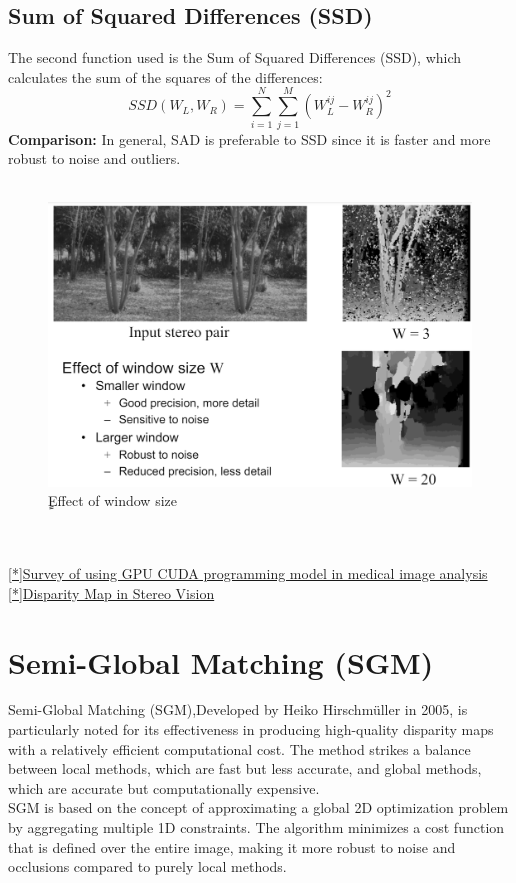 \documentclass[22pt]{report}
\begin{document}
        \subsection{Sum of Squared Differences (SSD)}
        The second function used is the Sum of Squared Differences (SSD), which calculates the sum of the squares of the differences:
        \[
        SSD(W_L, W_R) = \sum_{i=1}^N \sum_{j=1}^M (W_L^{ij} - W_R^{ij})^2
        \]
        \textbf{Comparison:}
        In general, SAD is preferable to SSD since it is faster and more robust to noise and outliers.\\\\
        \begin{figure}[h]
            \centering
            \includegraphics[width=0.5\linewidth]{Images/Window.png}
            \caption{ٍEffect of window size}
        \end{figure}
        \\\\\href{https://www.sciencedirect.com/science/article/pii/S235291481730045X}{[*]Survey of using GPU CUDA programming model in medical image analysis}\\
        \href{https://www.baeldung.com/cs/disparity-map-stereo-vision}{[*]Disparity Map in Stereo Vision}

        
    \section{Semi-Global Matching (SGM)}
        Semi-Global Matching (SGM),Developed by Heiko Hirschmüller in 2005, is particularly noted for its effectiveness in producing high-quality disparity maps with a relatively efficient computational cost. The method strikes a balance between local methods, which are fast but less accurate, and global methods, which are accurate but computationally expensive.\\
        SGM is based on the concept of approximating a global 2D optimization problem by aggregating multiple 1D constraints. The algorithm minimizes a cost function that is defined over the entire image, making it more robust to noise and occlusions compared to purely local methods.
\end{document}
